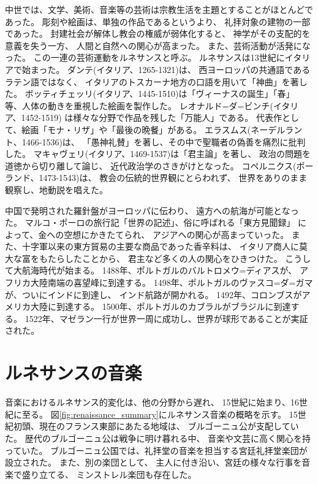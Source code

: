 \documentclass[a4j]{jarticle}
\begin{document}
中世では、文学、美術、音楽等の芸術は宗教生活を主題とすることがほとんどであった。
彫刻や絵画は、単独の作品であるというより、
礼拝対象の建物の一部であった。
封建社会が解体し教会の権威が弱体化すると、
神学がその支配的を意義を失う一方、
人間と自然への関心が高まった。
また、芸術活動が活発になった。
この一連の芸術運動をルネサンスと呼ぶ。
ルネサンスは13世紀にイタリアで始まった。
ダンテ(イタリア、1265-1321)は、
西ヨーロッパの共通語であるラテン語ではなく、
イタリアのトスカーナ地方の口語を用いて「神曲」を著した。
ボッティチェッリ(イタリア、1445-1510)は「ヴィーナスの誕生」「春」
等、人体の動きを重視した絵画を製作した。
レオナルド=ダ=ビンチ(イタリア、1452-1519)
は様々な分野で作品を残した「万能人」である。
代表作として、絵画「モナ・リザ」や「最後の晩餐」がある。
エラスムス(ネーデルラント、1466-1536)は、
「愚神礼賛」を著し、その中で聖職者の偽善を痛烈に批判した。
マキャヴェリ(イタリア、1469-1537)は「君主論」を著し、
政治の問題を道徳から切り離して論じ、
近代政治学のさきがけとなった。
コペルニクス(ポーランド、1473-1543)は、
教会の伝統的世界観にとらわれず、
世界をありのまま観察し、地動説を唱えた。

中国で発明された羅針盤がヨーロッパに伝わり、
遠方への航海が可能となった。
マルコ・ポーロの旅行記「世界の記述」、俗に呼ばれる「東方見聞録」
によって、金への空想にかきたてられ、
アジアへの関心が高まっていった。
また、十字軍以来の東方貿易の主要な商品であった香辛料は、
イタリア商人に莫大な富をもたらしたことから、
君主など多くの人の関心をひきつけた。
こうして大航海時代が始まる。
1488年、ポルトガルのバルトロメウ=ディアスが、
アフリカ大陸南端の喜望峰に到達する。
1498年、ポルトガルのヴァスコ=ダ=ガマが、ついにインドに到達し、
インド航路が開かれる。
1492年、コロンブスがアメリカ大陸に到達する。
1500年、ポルトガルのカブラルがブラジルに到達する。
1522年、マゼラン一行が世界一周に成功し、世界が球形であることが実証された。





\section{ルネサンスの音楽\label{sec:mus}}

音楽におけるルネサンス的変化は、他の分野から遅れ、
15世紀に始まり、16世紀に至る。
図\ref{fig:renaissance_summary}にルネサンス音楽の概略を示す。
15世紀初頭、現在のフランス東部にあたる地域は、
ブルゴーニュ公が支配していた。
歴代のブルゴーニュ公は戦争に明け暮れる中、
音楽や文芸に高く関心を持っていた。
ブルゴーニュ公国では、礼拝堂の音楽を担当する宮廷礼拝堂楽団が設立された。
また、別の楽団として、
主人に付き沿い、宮廷の様々な行事を音楽で盛り立てる、
ミンストレル楽団も存在した。
\end{document}
